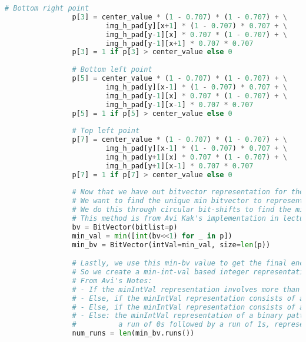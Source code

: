 \documentclass{article}
\begin{document}
\begin{lstlisting}[language=Python]
                # Bottom right point
                p[3] = center_value * (1 - 0.707) * (1 - 0.707) + \
                        img_h_pad[y][x+1] * (1 - 0.707) * 0.707 + \
                        img_h_pad[y-1][x] * 0.707 * (1 - 0.707) + \
                        img_h_pad[y-1][x+1] * 0.707 * 0.707
                p[3] = 1 if p[3] > center_value else 0
                
                # Bottom left point 
                p[5] = center_value * (1 - 0.707) * (1 - 0.707) + \
                        img_h_pad[y][x-1] * (1 - 0.707) * 0.707 + \
                        img_h_pad[y-1][x] * 0.707 * (1 - 0.707) + \
                        img_h_pad[y-1][x-1] * 0.707 * 0.707           
                p[5] = 1 if p[5] > center_value else 0
                
                # Top left point
                p[7] = center_value * (1 - 0.707) * (1 - 0.707) + \
                        img_h_pad[y][x-1] * (1 - 0.707) * 0.707 + \
                        img_h_pad[y+1][x] * 0.707 * (1 - 0.707) + \
                        img_h_pad[y+1][x-1] * 0.707 * 0.707
                p[7] = 1 if p[7] > center_value else 0
                
                # Now that we have out bitvector representation for the circle of points around the center
                # We want to find the unique min bitvector to represent the value at that point
                # We do this through circular bit-shifts to find the minimal representation:
                # This method is from Avi Kak's implementation in lecture 16
                bv = BitVector(bitlist=p)
                min_val = min([int(bv<<1) for _ in p])
                min_bv = BitVector(intVal=min_val, size=len(p))

                # Lastly, we use this min-bv value to get the final encoding for that point
                # So we create a min-int-val based integer representation of the binary pattern
                # From Avi's Notes:
                # - If the minIntVal representation involves more than two runs, encode it by the integer P + 1
                # - Else, if the minIntVal representation consists of all 0's, represent it be the encoding 0.
                # - Else, if the minIntVal representation consists of all 1's, represent it by the encoding P.
                # - Else: the minIntVal representation of a binary pattern has exactly two runs, that is, 
                #          a run of 0s followed by a run of 1s, represent the pattern by the number of 1's in the second run
                num_runs = len(min_bv.runs())
                

\end{lstlisting}
\end{document}
